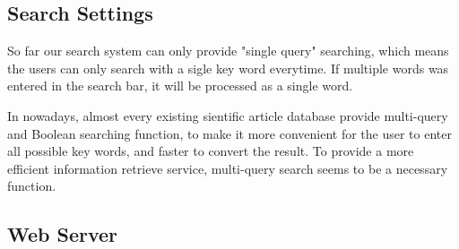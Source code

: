 \subsection{Search Settings}
So far our search system can only provide "single query" searching, which means the users can only search with a sigle key word everytime. If multiple words was entered in the search bar, it will be processed as a single word.

In nowadays, almost every existing sientific article database provide multi-query and Boolean searching function,
to make it more convenient for the user to enter all possible key words, and faster to convert the result. To provide a more efficient information retrieve service, multi-query search seems to be a necessary function.

\subsection{Web Server}